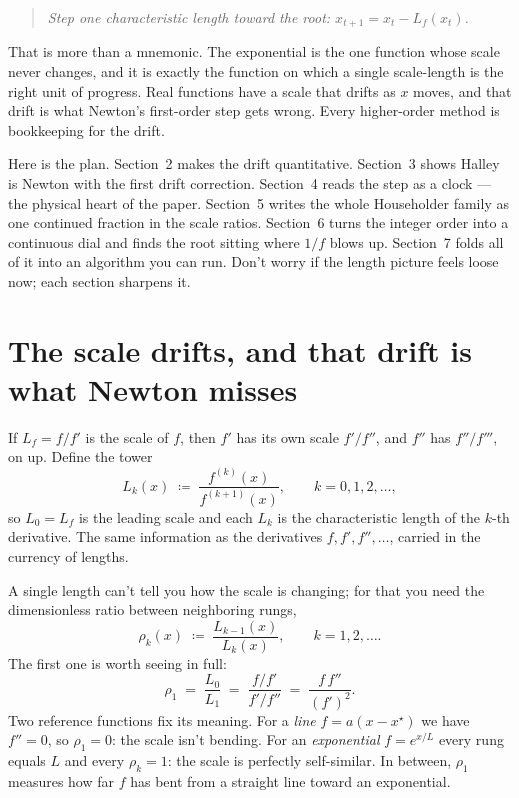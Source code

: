 \documentclass[11pt]{article}
\newcommand{\Lf}{L_{f}}                 %
\newcommand{\Lk}[1]{L_{#1}}             %
\newcommand{\rr}{\rho}                  %
\begin{document}
\begin{quote}
\itshape
Step one characteristic length toward the root: $x_{t+1}=x_t-\Lf(x_t)$.
\end{quote}

That is more than a mnemonic. The exponential is the one function whose scale never
changes, and it is exactly the function on which a single scale-length is the right
unit of progress. Real functions have a scale that drifts as $x$ moves, and that
drift is what Newton's first-order step gets wrong. Every higher-order method is
bookkeeping for the drift.

Here is the plan. Section~2 makes the drift quantitative. Section~3 shows Halley is
Newton with the first drift correction. Section~4 reads the step as a clock --- the
physical heart of the paper. Section~5 writes the whole Householder family as one
continued fraction in the scale ratios. Section~6 turns the integer order into a
continuous dial and finds the root sitting where $1/f$ blows up. Section~7 folds all
of it into an algorithm you can run. Don't worry if the length picture feels loose
now; each section sharpens it.

\section{The scale drifts, and that drift is what Newton misses}

If $\Lf=f/f'$ is the scale of $f$, then $f'$ has its own scale $f'/f''$, and $f''$
has $f''/f'''$, on up. Define the tower
\begin{equation}
  \Lk{k}(x) \;\coloneqq\; \frac{f^{(k)}(x)}{f^{(k+1)}(x)},
  \qquad k=0,1,2,\dots,
  \label{eq:tower}
\end{equation}
so $\Lk{0}=\Lf$ is the leading scale and each $\Lk{k}$ is the characteristic length
of the $k$-th derivative. The same information as the derivatives $f,f',f'',\dots$,
carried in the currency of lengths.

A single length can't tell you how the scale is changing; for that you need the
dimensionless ratio between neighboring rungs,
\begin{equation}
  \rr_k(x) \;\coloneqq\; \frac{\Lk{k-1}(x)}{\Lk{k}(x)},
  \qquad k=1,2,\dots.
  \label{eq:ratio}
\end{equation}
The first one is worth seeing in full:
\begin{equation}
  \rr_1 \;=\; \frac{\Lk{0}}{\Lk{1}}
        \;=\; \frac{f/f'}{f'/f''}
        \;=\; \frac{f\,f''}{(f')^{2}}.
  \label{eq:rho1}
\end{equation}
Two reference functions fix its meaning. For a \emph{line} $f=a(x-x^\star)$ we have
$f''=0$, so $\rr_1=0$: the scale isn't bending. For an \emph{exponential}
$f=e^{x/L}$ every rung equals $L$ and every $\rr_k=1$: the scale is perfectly
self-similar. In between, $\rr_1$ measures how far $f$ has bent from a straight line
toward an exponential.
\end{document}

